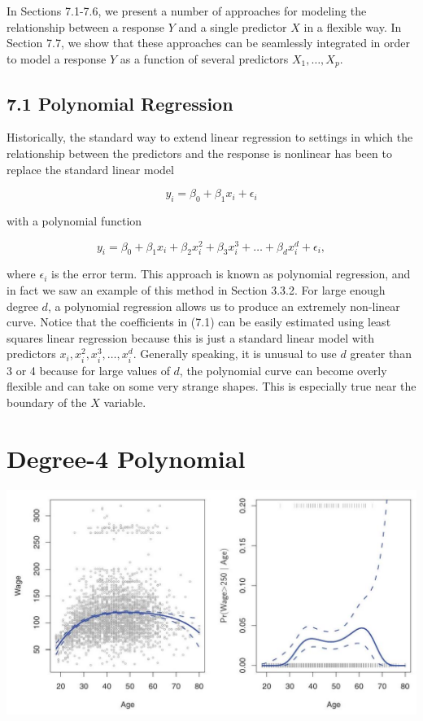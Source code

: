 \documentclass[10pt]{article}
\begin{document}
In Sections 7.1-7.6, we present a number of approaches for modeling the relationship between a response $Y$ and a single predictor $X$ in a flexible way. In Section 7.7, we show that these approaches can be seamlessly integrated in order to model a response $Y$ as a function of several predictors $X_{1}, \ldots, X_{p}$.

\subsection*{7.1 Polynomial Regression}
Historically, the standard way to extend linear regression to settings in which the relationship between the predictors and the response is nonlinear has been to replace the standard linear model

$$
y_{i}=\beta_{0}+\beta_{1} x_{i}+\epsilon_{i}
$$

with a polynomial function


\begin{equation*}
y_{i}=\beta_{0}+\beta_{1} x_{i}+\beta_{2} x_{i}^{2}+\beta_{3} x_{i}^{3}+\ldots+\beta_{d} x_{i}^{d}+\epsilon_{i}, \tag{7.1}
\end{equation*}


where $\epsilon_{i}$ is the error term. This approach is known as polynomial regression, and in fact we saw an example of this method in Section 3.3.2. For large enough degree $d$, a polynomial regression allows us to produce an extremely non-linear curve. Notice that the coefficients in (7.1) can be easily estimated using least squares linear regression because this is just a standard linear model with predictors $x_{i}, x_{i}^{2}, x_{i}^{3}, \ldots, x_{i}^{d}$. Generally speaking, it is unusual to use $d$ greater than 3 or 4 because for large values of $d$, the polynomial curve can become overly flexible and can take on some very strange shapes. This is especially true near the boundary of the $X$ variable.

\section*{Degree-4 Polynomial}
\begin{center}
\includegraphics[max width=\textwidth]{2025_05_05_efe77898333945044de4g-282}
\end{center}
\end{document}
